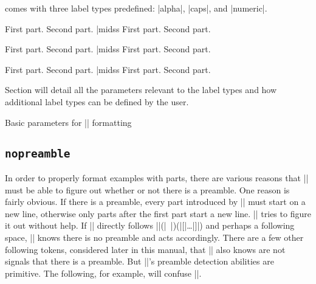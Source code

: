 \expex\/ comes with three label types predefined: |alpha|,
|caps|, and |numeric|.

\beginss
\pex[labeltype=alpha]
\a First part.
\a Second part.
\xe |midss
\pex[labeltype=alpha]
\a First part.
\a Second part.
\xe
\endss

\beginss
\pex[labeltype=caps]
\a First part.
\a Second part.
\xe |midss
\pex[labeltype=caps]
\a First part.
\a Second part.
\xe
\endss

\beginss
\pex[labeltype=numeric]
\a First part.
\a Second part.
\xe |midss
\pex[labeltype=numeric]
\a First part.
\a Second part.
\xe
\endss

Section  will detail all the parameters relevant
to the label types and how additional label types can be defined
by the user.

\ex Basic parameters for |\pex| formatting\smallskip
\leftskip=0pt
\hfil{}\xe

\subsection {\tt nopreamble}

In order to properly format examples with parts, there are
various reasons that |\pex| must be able to figure out whether
or not there is a preamble.  One reason is fairly obvious.  If
there is a preamble, every part introduced by |\a| must start on
a new line, otherwise only parts after the first part start a new
line.  |\pex| tries to figure it out without help.  If |\a|
directly follows |\pex|(|~|)(|[|\dots|]|) and perhaps a following
space, |\pex| knows there is no preamble and acts accordingly.
There are a few other following tokens, considered later in this
manual, that |\pex| also knows are not signals that there is a
preamble.  But |\pex|'s preamble detection abilities are
primitive.  The following, for example, will confuse |\pex|.

